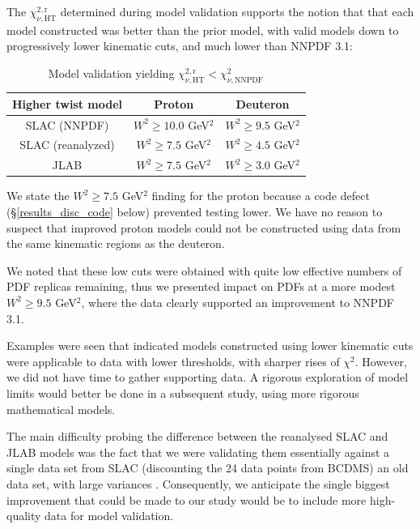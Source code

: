 \documentclass[12pt,a4paper]{report}
\begin{document}
The $\chi_{\nu,\textrm{HT}}^{2,\textrm{r}}$ determined during model validation supports the notion that that each model constructed was better than the prior model, with valid models down to progressively lower kinematic cuts, and much lower than NNPDF 3.1:
\begin{table}[H]
\begin{center}
\begin{tabular}{|c|c|c|}
\hline
Higher twist model & Proton & Deuteron\\
\hline
SLAC (NNPDF)  & $W^2 \ge 10.0$ GeV$^2$ & $W^2 \ge 9.5$ GeV$^2$\\
SLAC (reanalyzed) & $W^2 \ge 7.5$ GeV$^2$ & $W^2 \ge 4.5$ GeV$^2$\\
JLAB & $W^2 \ge 7.5$ GeV$^2$ & $W^2 \ge 3.0$ GeV$^2$\\
\hline
\end{tabular}
\caption{Model validation yielding $\chi_{\nu,\textrm{HT}}^{2,\textrm{r}} < \chi_{\nu,\textrm{NNPDF}}^2$}
\label{tb:results_model_validate_summary}
\end{center}
\end{table}
We state the $W^2 \ge 7.5$ GeV$^2$ finding for the proton because a code defect (\S \ref{results_disc_code} below) prevented testing lower. We have no reason to suspect that improved proton models could not be constructed using data from the same kinematic regions as the deuteron.

We noted that these low cuts were obtained with quite low effective numbers of PDF replicas remaining, thus we presented impact on PDFs at a more modest $W^2 \ge 9.5$ GeV$^2$, where the data clearly supported an improvement to NNPDF 3.1.

Examples were seen that indicated models constructed using lower kinematic cuts were applicable to data with lower thresholds, with sharper rises of $\chi^2$. However, we did not have time to gather supporting data. A rigorous exploration of model limits would better be done in a subsequent study, using more rigorous mathematical models.

The main difficulty probing the difference between the reanalysed SLAC and JLAB models was the fact that we were validating them essentially against a single data set from SLAC (discounting the 24 data points from BCDMS) an old data set, with large variances \cite{Whitlow}. Consequently, we anticipate the single biggest improvement that could be made to our study would be to include more high-quality data for model validation.
\end{document}
